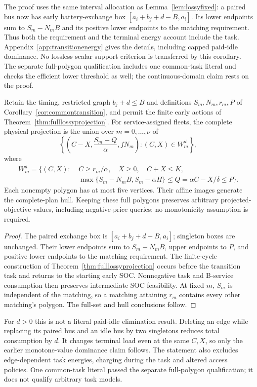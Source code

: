 The proof uses the same interval allocation as
Lemma~\ref{lem:lossyfixed}: a paired bus now has early battery-exchange box
$[a_i+b_j+d-B,a_i]$. Its lower endpoints sum to $S_m-N_mB$ and its positive
lower endpoints to the matching requirement. Thus both the requirement and
the terminal energy account include the task. Appendix~\ref{app:transitionenergy}
gives the details, including capped paid-idle dominance. No lossless scalar
support criterion is transferred by this corollary. The separate full-polygon
qualification includes one common-task literal and checks the efficient lower
threshold as well; the continuous-domain claim rests on the proof.

\begin{corollary}
\label{cor:commontransitionfull}
Retain the timing, restricted graph $b_j+d\le B$ and definitions
$S_m,N_m,r_m,P$ of Corollary~\ref{cor:commontransition}, and permit
the finite early actions of Theorem~\ref{thm:fulllossyprojection}.
For service-assigned fleets, the complete physical projection is the union
over $m=0,\ldots,\nu$ of
\[
 \left\{\left(C-X,\frac{S_m-Q}{\alpha},fN_m\right):
          (C,X)\in W_m^{d}\right\},
\]
where
\[
\begin{split}
 W_m^{d}=\bigl\{(C,X):\;&C\ge r_m/\alpha,\quad X\ge0,
                  \quad C+X\le K,\\
 &\max\{S_m-N_mB,S_m-\alpha H\}
       \le Q=\alpha C-X/\delta\le P\bigr\}.
\end{split}
\]
Each nonempty polygon has at most five vertices. Their affine images
generate the complete-plan hull. Keeping these full polygons preserves
arbitrary projected-objective values, including negative-price queries;
no monotonicity assumption is required.
\end{corollary}
\begin{proof}
The paired exchange box is $[a_i+b_j+d-B,a_i]$; singleton boxes are
unchanged. Their lower endpoints sum to $S_m-N_mB$, upper endpoints to
$P$, and positive lower endpoints to the matching requirement.
The finite-cycle construction of Theorem~\ref{thm:fulllossyprojection}
occurs before the transition task and returns to the starting early SOC.
Nonnegative task and B-service consumption then preserves intermediate
SOC feasibility. At fixed $m$, $S_m$ is independent of the matching,
so a matching attaining $r_m$ contains every other matching's polygon.
The full-set and hull conclusions follow.
\end{proof}
For $d>0$ this is not a literal paid-idle elimination result. Deleting
an edge while replacing its paired bus and an idle bus by two singletons
reduces total consumption by $d$. It changes terminal load even at the
same $C,X$, so only the earlier monotone-value dominance claim follows.
The statement also excludes edge-dependent task energies, charging during
the task and altered access policies. One common-task literal passed the
separate full-polygon qualification; it does not qualify arbitrary task models.

